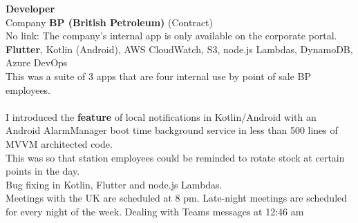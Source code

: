 \documentclass{article}
\let\svthefootnote\thefootnote
\newcommand\Cfootnote[2][black]{\def\thefootnote{\color{#1}\svthefootnote}%
  \footnote{\color{#1}#2}}
\begin{document}
%
%
%
%
%
%
%
%
%

\textbf{ Developer }\\
Company  \textbf {BP (British Petroleum)}  (Contract) \\
No link: The company's internal app is only available on the corporate portal. \\

\textbf{Flutter}, Kotlin (Android), AWS CloudWatch, S3, node.js Lambdas,  DynamoDB, \\ 
Azure DevOps  \\

This was a suite of 3 apps that are four internal use by point of sale BP employees. \\
\\
I introduced the {\bf feature} of local notifications in Kotlin/Android with an Android AlarmManager boot time background service in less than 500 lines of MVVM architected code. \\
This was so that station employees could be reminded to rotate stock at certain points in the day. \\
 Bug fixing in Kotlin, Flutter and node.js Lambdas. \\
 Meetings with the UK are scheduled at 8 pm. Late-night meetings are scheduled for every night of the week. Dealing with Teams messages at 12:46 am \\
\\
\end{document}
